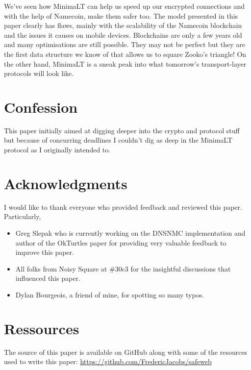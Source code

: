 \documentclass{vldb}
\begin{document}
We've seen how MinimaLT can help us speed up our encrypted connections and with the help of Namecoin, make them safer too. The model presented in this paper clearly has flaws, mainly with the scalability of the Namecoin blockchain and the issues it causes on mobile devices. Blockchains are only a few years old and many optimisations are still possible. They may not be perfect but they are the first data structure we know of that allows us to square Zooko's triangle! On the other hand, MinimaLT is a sneak peak into what tomorrow's transport-layer protocols will look like.

\balance

\section{Confession}
This paper initially aimed at digging deeper into the crypto and protocol stuff but because of concurring deadlines I couldn't dig as deep in the MinimaLT protocol as I originally intended to.

\section{Acknowledgments}
I would like to thank everyone who provided feedback and reviewed this paper. Particularly, 
\begin{itemize}
\item Greg Slepak who is currently working on the DNSNMC implementation and author of the OkTurtles\cite{okTurtles} paper for providing very valuable feedback to improve this paper.
\item All folks from Noisy Square at \#30c3 for the insightful discussions that influenced this paper.
\item Dylan Bourgeois, a friend of mine, for spotting so many typos.
\end{itemize}

\section{Ressources}

The source of this paper is available on GitHub along with some of the resources used to write this paper: \newline
\url{https://github.com/FredericJacobs/safeweb}



\end{document}
